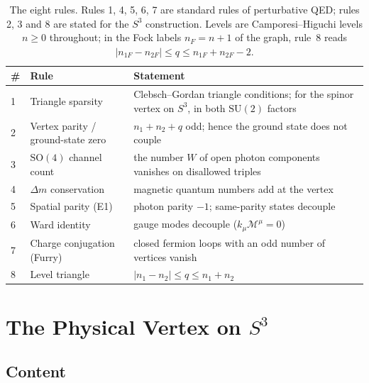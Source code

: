 \documentclass[11pt]{article}
\begin{document}
\begin{table}[h]
\centering
\small
\begin{tabular}{lll}
\toprule
\# & Rule & Statement \\
\midrule
1 & Triangle sparsity & Clebsch--Gordan triangle conditions; for the
spinor vertex on $S^3$, in both $\mathrm{SU}(2)$ factors \\
2 & Vertex parity / ground-state zero & $n_1 + n_2 + q$ odd; hence the
ground state does not couple \\
3 & $\mathrm{SO}(4)$ channel count & the number $W$ of open photon
components vanishes on disallowed triples \\
4 & $\Delta m$ conservation & magnetic quantum numbers add at the vertex \\
5 & Spatial parity (E1) & photon parity $-1$; same-parity states
decouple \\
6 & Ward identity & gauge modes decouple ($k_\mu \mathcal{M}^\mu = 0$) \\
7 & Charge conjugation (Furry) & closed fermion loops with an odd number
of vertices vanish \\
8 & Level triangle & $|n_1 - n_2| \le q \le n_1 + n_2$ \\
\bottomrule
\end{tabular}
\caption{The eight rules.  Rules 1, 4, 5, 6, 7 are standard rules of
perturbative QED; rules 2, 3 and 8 are stated for the $S^3$
construction.  Levels are Camporesi--Higuchi levels $n \ge 0$
throughout; in the Fock labels $n_F = n + 1$ of the graph, rule~8 reads
$|n_{1F} - n_{2F}| \le q \le n_{1F} + n_{2F} - 2$.}
\label{tab:eight_rules}
\end{table}

\section{The Physical Vertex on $S^3$}
\label{sec:physical}

\subsection{Content}
\end{document}
